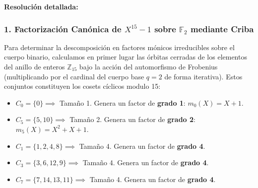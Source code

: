 \documentclass{article}
\begin{document}
\textbf{Resolución detallada:}

\subsubsection{1. Factorización Canónica de \texorpdfstring{$X^{15} - 1$}{X15 - 1} sobre \texorpdfstring{$\mathbb{F}_2$}{F2} mediante Criba}
Para determinar la descomposición en factores mónicos irreducibles sobre el cuerpo binario, calculamos en primer lugar las órbitas cerradas de los elementos del anillo de enteros $\mathbb{Z}_{15}$ bajo la acción del automorfismo de Frobenius (multiplicando por el cardinal del cuerpo base $q=2$ de forma iterativa). Estos conjuntos constituyen los cosets cíclicos modulo 15:
\begin{itemize}
    \item $C_0 = \{0\} \implies$ Tamaño 1. Genera un factor de \textbf{grado 1}: $m_0(X) = X + 1$.
    \item $C_5 = \{5, 10\} \implies$ Tamaño 2. Genera un factor de \textbf{grado 2}: $m_5(X) = X^2 + X + 1$.
    \item $C_1 = \{1, 2, 4, 8\} \implies$ Tamaño 4. Genera un factor de \textbf{grado 4}.
    \item $C_3 = \{3, 6, 12, 9\} \implies$ Tamaño 4. Genera un factor de \textbf{grado 4}.
    \item $C_7 = \{7, 14, 13, 11\} \implies$ Tamaño 4. Genera un factor de \textbf{grado 4}.
\end{itemize}
\end{document}

